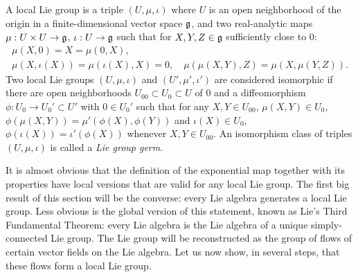 \begin{defn}
    A local Lie group is a triple $(U,\mu,\iota)$ where $U$ is an open neighborhood of the origin in a finite-dimensional vector space $\mathfrak{g}$, and two real-analytic maps $\mu:U\times U\to\mathfrak{g}$, $\iota:U\to\mathfrak{g}$ such that for $X,Y,Z\in\mathfrak{g}$ sufficiently close to $0$:
    \begin{gather}
        \mu(X,0)=X=\mu(0,X),\\
        \mu(X,\iota(X))=\mu(\iota(X),X)=0,\quad \mu(\mu(X,Y),Z)=\mu(X,\mu(Y,Z)).
    \end{gather}
    Two local Lie groups $(U,\mu,\iota)$ and $(U',\mu',\iota')$ are considered isomorphic if there are open neighborhoods $U_{00}\subset U_0\subset U$ of $0$ and a diffeomorphism $\phi:U_0\to U_0'\subset U'$ with $0\in U_0'$ such that for any $X,Y\in U_{00}$, $\mu(X,Y)\in U_0$, $\phi(\mu(X,Y))=\mu'(\phi(X),\phi(Y))$ and $\iota(X)\in U_0$, $\phi(\iota(X))=\iota'(\phi(X))$ whenever $X,Y\in U_{00}$. An isomorphism class of triples $(U,\mu,\iota)$ is called a \emph{Lie group germ}.
\end{defn}

It is almost obvious that the definition of the exponential map together with its properties have local versions that are valid for any local Lie group. The first big result of this section will be the converse: every Lie algebra generates a local Lie group. Less obvious is the global version of this statement, known as Lie's Third Fundamental Theorem: every Lie algebra is the Lie algebra of a unique simply-connected Lie group. The Lie group will be reconstructed as the group of flows of certain vector fields on the Lie algebra. Let us now show, in several steps, that these flows form a local Lie group.

